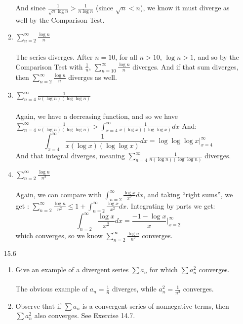\begin{enumerate}
\begin{enumerate}
        And since $\frac{1}{\sqrt{n} \log n} > \frac{1}{n \log n}$ (since $\sqrt{n} < n$), we know it must diverge as well by the Comparison Test.\\
      \item $\sum_{n=2}^\infty \frac{\log n}{n}$\\\\
        The series diverges. After $n=10$, for all $n > 10$, $\log n > 1$, and so by the Comparison Test with $\frac{1}{n}$, $\sum_{n=10}^\infty \frac{\log n}{n}$ diverges. And if that sum diverges, then $\sum_{n=2}^\infty \frac{\log n}{n}$ diverges as well.
      \item $\sum_{n=4}^\infty \frac{1}{n(\log n)(\log \log n)}$\\\\

        Again, we have a decreasing function, and so we have $\sum_{n=4}^\infty \frac{1}{n(\log n)(\log \log n)} > \int_{x=4}^\infty \frac{1}{x(\log x)(\log \log x)} dx$
        And:
        $$\int_{x=4}^\infty \frac{1}{x(\log x)(\log \log x)} dx = \log \log \log x |_{x=4}^\infty$$
        And that integral diverges, meaning $\sum_{n=4}^\infty \frac{1}{n(\log n)(\log \log n)}$ diverges.
      \item $\sum_{n=2}^\infty \frac{\log n}{n^2}$\\\\
        Again, we can compare with $\int_{n=2}^\infty \frac{\log x}{x^2} dx$, and taking ``right sums'', we get : $\sum_{n=2}^\infty \frac{\log n}{n^2} \leq 1 + \int_{n=2}^\infty \frac{\log x}{x^2} dx$. Integrating by parts we get:        
        $$\int_{n=2}^\infty \frac{\log x}{x^2} dx = \frac{-1 - \log x}{x} |_{x=2}^\infty$$
        which converges, so we know $\sum_{n=2}^\infty \frac{\log n}{n^2}$ converges.
    \end{enumerate}
  \item [15.6]
    \begin{enumerate}
      \item Give an example of a divergent series $\sum a_n$ for which $\sum a_n^2$ converges.\\\\
        The obvious example of $a_n = \frac{1}{n}$ diverges, while $a_n^2 = \frac{1}{n^2}$ converges.\\

      \item Observe that if $\sum a_n$ is a convergent series of nonnegative terms, then $\sum a_n^2$ also converges. See Exercise 14.7.\\\\


\end{enumerate}
\end{enumerate}

